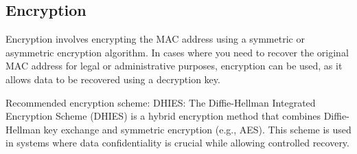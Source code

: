 \documentclass[aps,prb,twocolumn,superscriptaddress,floatfix,longbibliography,nofootinbib]{revtex4-2}
\begin{document}
  \subsection{\label{subsec:Encryption}Encryption}




  Encryption involves encrypting the MAC address using a symmetric or asymmetric encryption algorithm.
  In cases where you need to recover the original MAC address for legal or administrative purposes,
  encryption can be used, as it allows data to be recovered using a decryption key.

  Recommended encryption scheme: DHIES: The Diffie-Hellman Integrated Encryption Scheme (DHIES) 
  is a hybrid encryption method that combines Diffie-Hellman key exchange and symmetric encryption
  (e.g., AES). This scheme is used in systems where data confidentiality is crucial 
  while allowing controlled recovery.
\end{document}
